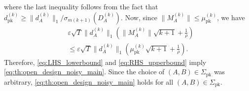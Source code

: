 \documentclass[journal,twoside,web]{ieeecolor}
\begin{document}
where the last inequality follows from the fact that \mbox{$d_\text{pk}^{(k)}\geq \|d_A^{(k)}\|_1/\sigma_{m(k+1)}(D_{A}^{(k)})$}. Now, since $\|M_{A}^{(k)}\|\leq\mu_\text{pk}^{(k)}$, we have
\begin{equation}
\label{eq:RHS_upperbound}
\begin{split}
&\varepsilon\sqrt{T}\|d_A^{(k)}\|_1\left(\|M_{A}^{(k)}\|\sqrt{k+1}+\tfrac{1}{\rho}\right)\\
&\leq\varepsilon\sqrt{T}\|d_A^{(k)}\|_1\left(\mu_\text{pk}^{(k)}\sqrt{k+1}+\tfrac{1}{\rho}\right).
\end{split}
\end{equation}
Therefore, \eqref{eq:LHS_lowerbound} and \eqref{eq:RHS_upperbound} imply \eqref{eq:th:open_design_noisy_main}. Since the choice of $(A,B)\in\Sigma_\text{pk}$ was arbitrary, \eqref{eq:th:open_design_noisy_main} holds for all $(A,B)\in\Sigma_\text{pk}$. 
\end{document}
